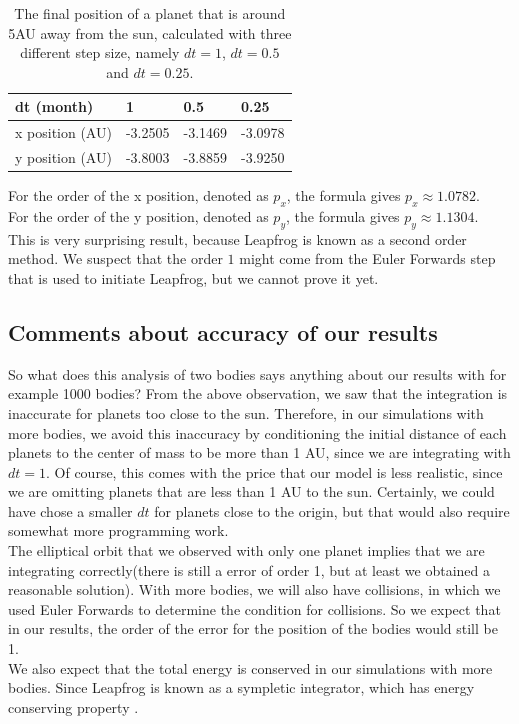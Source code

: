 \begin{table}[htb]
\centering
\caption{The final position of a planet that is around 5AU away from the sun, calculated with three different step size, namely $dt=1$, $dt=0.5$ and $dt=0.25$.}
\begin{tabular}{|l|l|l|l|}
\hline
dt (month)&1&0.5&0.25\\ \hline
x position (AU)&-3.2505&   -3.1469&   -3.0978\\ \hline
y position (AU)&   -3.8003&   -3.8859&   -3.9250\\ \hline
\end{tabular}
\label{tab:Richardson5AU}
\end{table}

For the order of the x position, denoted as $p_x$, the formula gives $p_x\approx 1.0782$.\\
For the order of the y position, denoted as $p_y$, the formula gives $p_y\approx 1.1304$.\\ 

This is very surprising result, because Leapfrog is known as a second order method. 
We suspect that the order $1$ might come from the Euler Forwards step that is used to initiate Leapfrog, but we cannot prove it yet.
\subsection{Comments about accuracy of our results}
So what does this analysis of two bodies says anything about our results with for example 1000 bodies? From the above observation, we saw that the integration is inaccurate for planets too close to the sun. Therefore, in our simulations with more bodies, we avoid this inaccuracy by conditioning the initial distance of each planets to the center of mass to be more than 1 AU, since we are integrating with $dt=1$. Of course, this comes with the price that our model is less realistic, since we are omitting planets that are less than 1 AU to the sun. Certainly, we could have chose a smaller $dt$ for planets close to the origin, but that would also require somewhat more programming work.\\

The elliptical orbit that we observed with only one planet implies that we are integrating correctly(there is still a error of order 1, but at least we obtained a reasonable solution). With more bodies, we will also have collisions, in which we used Euler Forwards to determine the condition for collisions. So we expect that in our results, the order of the error for the position of the bodies would still be 1.\\

We also expect that the total energy is conserved in our simulations with more bodies. Since Leapfrog is known as a sympletic integrator, which has energy conserving property \cite{Leapfrogsympletic}. 